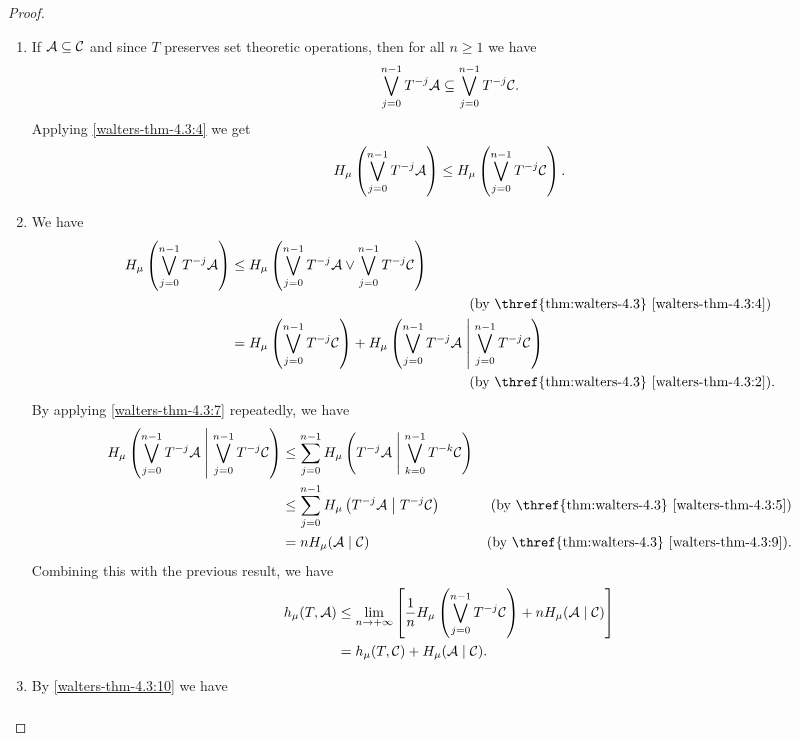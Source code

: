 \begin{theorem}
\begin{proof}
\begin{enumerate}
			\item If $\mathcal{A} \subseteq \mathcal{C}$ and since $T$ preserves set theoretic operations, then for all $n \geq 1$ we have
				\[
					\bigvee_{j = 0}^{n - 1}{T^{-j}{\mathcal{A}}} \subseteq \bigvee_{j = 0}^{n - 1}{T^{-j}{\mathcal{C}}}.
				\]
				Applying  \ref{walters-thm-4.3:4} we get
				\[
					H_\mu\left(\bigvee_{j = 0}^{n - 1}{T^{-j}{\mathcal{A}}}\right) \leq H_\mu\left(\bigvee_{j = 0}^{n - 1}{T^{-j}{\mathcal{C}}}\right).
				\]
			\item We have
				\begin{align*}
					H_\mu\left(\bigjoin_{j = 0}^{n - 1}{T^{-j}{\A}}\right) &\leq H_\mu\left(\bigjoin_{j = 0}^{n - 1}{T^{-j}{\A}} \join \bigjoin_{j = 0}^{n - 1}{T^{-j}{\C}}\right) \\ & \hspace{60mm} \text{(by \thref{thm:walters-4.3} \ref{walters-thm-4.3:4})} \\
						&= H_\mu\left(\bigjoin_{j = 0}^{n - 1}{T^{-j}{\C}}\right) + H_\mu\left(\bigjoin_{j = 0}^{n - 1}{T^{-j}{\A}} \midmid \bigjoin_{j = 0}^{n - 1}{T^{-j}{\C}}\right) \\ & \hspace{60mm} \text{(by \thref{thm:walters-4.3} \ref{walters-thm-4.3:2}).}
				\end{align*}
				By applying  \ref{walters-thm-4.3:7} repeatedly, we have
				\begin{align*}
					H_\mu\left(\bigjoin_{j = 0}^{n - 1}{T^{-j}{\A}} \midmid \bigjoin_{j = 0}^{n - 1}{T^{-j}{\C}}\right) &\leq \sum_{j = 0}^{n - 1}{H_\mu\left(T^{-j}{\A} \midmid \bigjoin_{k = 0}^{n - 1}{T^{-k}{\C}}\right)} \\
						&\leq \sum_{j = 0}^{n - 1}{H_\mu\left(T^{-j}{\A} \midmid T^{-j}{\C}\right)} & \text{(by \thref{thm:walters-4.3} \ref{walters-thm-4.3:5})} \\
						&= nH_\mu(\A \mid \C) & \text{(by \thref{thm:walters-4.3} \ref{walters-thm-4.3:9}).}
				\end{align*}
				Combining this with the previous result, we have
				\begin{align*}
					h_\mu(T, \mathcal{A}) &\leq \lim_{n \to +\infty}{\left[\frac{1}{n} H_\mu\left(\bigvee_{j = 0}^{n - 1}{T^{-j}{\mathcal{C}}}\right) + nH_\mu(\mathcal{A} \mid \mathcal{C})\right]} \\
						&= h_\mu(T, \mathcal{C}) + H_\mu(\mathcal{A} \mid \mathcal{C}).
				\end{align*}
			\item By  \ref{walters-thm-4.3:10} we have
				\begin{align*}

\end{align*}
\end{enumerate}
\end{proof}
\end{theorem}
